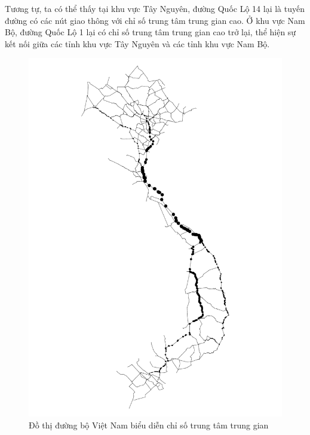 \documentclass[14pt, oneside, a4paper, openany]{scrartcl}
\begin{document}
Tương tự, ta có thể thấy tại khu vực Tây Nguyên, đường Quốc Lộ 14 lại là tuyến đường có các nút giao thông với chỉ số trung tâm trung gian cao. Ở khu vực Nam Bộ, đường Quốc Lộ 1 lại có chỉ số trung tâm trung gian cao trở lại, thể hiện sự kết nối giữa các tỉnh khu vực Tây Nguyên và các tỉnh khu vực Nam Bộ.

\begin{figure}
	\centering
	\includegraphics[scale=0.7]{figures/vietnamroadbetweeness.pdf} 
	\caption[Đồ thị đường bộ Việt Nam biểu diễn chỉ số trung tâm trung gian]{Đồ thị đường bộ Việt Nam biểu diễn chỉ số trung tâm trung gian}
	\label{fig:betweeness}
\end{figure}
\end{document}
